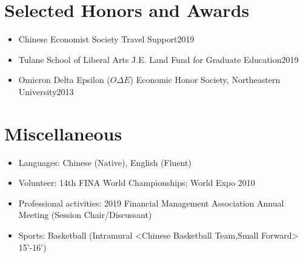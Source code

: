 \documentclass{resume}
\begin{document}

\section{Selected Honors and Awards}
\begin{itemize}[parsep=0.25ex]
  \item Chinese Economist Society Travel Support\hfill 2019
  \item Tulane School of Liberal Arts J.E. Land Fund for Graduate Education\hfill 2019
  \item Omicron Delta Epsilon ($O\Delta E$) Economic Honor Society, Northeastern University\hfill 2013
\end{itemize}

\section{Miscellaneous}
\begin{itemize}[parsep=0.25ex]
  \item Languages: 
  Chinese (Native), English (Fluent)
  
  \item Volunteer:
  14th FINA World Championships; World Expo 2010
  
  \item Professional activities:
  2019 Financial Management Association Annual Meeting (Session Chair/Discussant)
  
  \item Sports: 
  Basketball (Intramural <Chinese Basketball Team,Small Forward> 15'-16')

\end{itemize}

%
%
\end{document}
